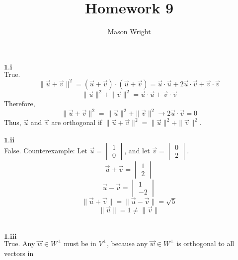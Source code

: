 \documentclass[letterpaper,12pt]{article}
\author{Mason Wright}
\title{Homework 9}
\begin{document}
\maketitle
$\mathbf{1.i}$
\\True.
\begin{equation*}
\| \vec{u} + \vec{v} \| ^2 = ( \vec{u} + \vec{v} ) \cdot ( \vec{u} + \vec{v} ) = \vec{u} \cdot \vec{u} + 2 \vec{u} \cdot \vec{v} + \vec{v} \cdot \vec{v}
\end{equation*}
\begin{equation*}
\| \vec{u} \| ^2 + \| \vec{v} \| ^2 = \vec{u} \cdot \vec{u} + \vec{v} \cdot \vec{v}
\end{equation*}
Therefore,
\begin{equation*}
\| \vec{u} + \vec{v} \| ^2 = \| \vec{u} \| ^2 + \| \vec{v} \| ^2 \rightarrow 2 \vec{u} \cdot \vec{v} = 0 
\end{equation*}
Thus, $\vec{u}$ and $\vec{v}$ are orthogonal if $\| \vec{u} + \vec{v} \| ^2 = \| \vec{u} \| ^2 + \| \vec{v} \| ^2$.
\\
\\$\mathbf{1.ii}$
\\False. Counterexample:
Let $\vec{u} = 
\begin{vmatrix}
1 \\
0
\end{vmatrix}$, and let
$\vec{v} =
\begin{vmatrix}
0 \\
2
\end{vmatrix}$.
\begin{equation*}
\vec{u} + \vec{v} = 
\begin{vmatrix}
1 \\
2
\end{vmatrix}
\end{equation*}
\begin{equation*}
\vec{u} - \vec{v} = 
\begin{vmatrix}
1 \\
-2
\end{vmatrix}
\end{equation*}
\begin{equation*}
\| \vec{u} + \vec{v} \| = \| \vec{u} - \vec{v} \| = \sqrt{5}
\end{equation*}
\begin{equation*}
\| \vec{u} \| = 1 \neq \| \vec{v} \|
\end{equation*}
\\
\\$\mathbf{1.iii}$
\\True. Any $\vec{w} \in W^{\perp}$ must be in $V^{\perp}$, because any $\vec{w} \in W^{\perp}$ is orthogonal to all vectors in
\end{document}
